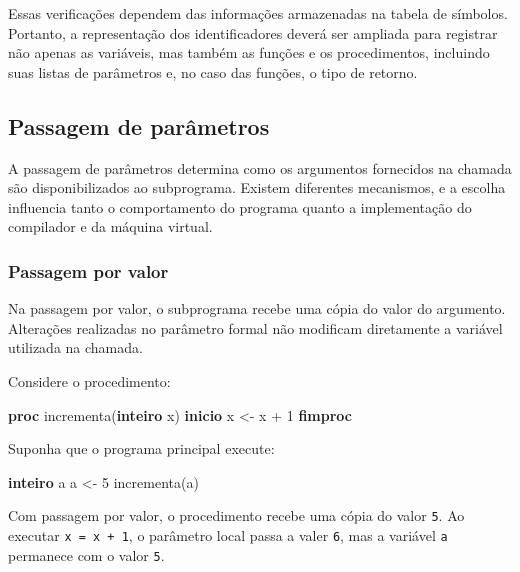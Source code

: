 \documentclass[
  brazilian,
  letterpaper,
]{book}
\newenvironment{Shaded}{\begin{snugshade}}{\end{snugshade}}
\newcommand{\DecValTok}[1]{\textcolor[rgb]{0.68,0.00,0.00}{#1}}
\newcommand{\KeywordTok}[1]{\textcolor[rgb]{0.00,0.23,0.31}{\textbf{#1}}}
\newcommand{\NormalTok}[1]{\textcolor[rgb]{0.00,0.23,0.31}{#1}}
\theoremstyle{plain}
\theoremstyle{definition}
\theoremstyle{remark}
\begin{document}
Essas verificações dependem das informações armazenadas na tabela de
símbolos. Portanto, a representação dos identificadores deverá ser
ampliada para registrar não apenas as variáveis, mas também as funções e
os procedimentos, incluindo suas listas de parâmetros e, no caso das
funções, o tipo de retorno.

\subsection{Passagem de parâmetros}\label{passagem-de-paruxe2metros}

A passagem de parâmetros determina como os argumentos fornecidos na
chamada são disponibilizados ao subprograma. Existem diferentes
mecanismos, e a escolha influencia tanto o comportamento do programa
quanto a implementação do compilador e da máquina virtual.

\subsubsection{Passagem por valor}\label{passagem-por-valor}

Na passagem por valor, o subprograma recebe uma cópia do valor do
argumento. Alterações realizadas no parâmetro formal não modificam
diretamente a variável utilizada na chamada.

Considere o procedimento:

\begin{Shaded}
\begin{Highlighting}[]
\KeywordTok{proc}\NormalTok{ incrementa(}\KeywordTok{inteiro}\NormalTok{ x)}
\KeywordTok{inicio}
\NormalTok{    x \textless{}{-} x + }\DecValTok{1}
\KeywordTok{fimproc}
\end{Highlighting}
\end{Shaded}

Suponha que o programa principal execute:

\begin{Shaded}
\begin{Highlighting}[]
\KeywordTok{inteiro}\NormalTok{ a}
\NormalTok{a \textless{}{-} }\DecValTok{5}
\NormalTok{incrementa(a)}
\end{Highlighting}
\end{Shaded}

Com passagem por valor, o procedimento recebe uma cópia do valor
\texttt{5}. Ao executar \texttt{x\ =\ x\ +\ 1}, o parâmetro local passa
a valer \texttt{6}, mas a variável \texttt{a} permanece com o valor
\texttt{5}.
\end{document}
